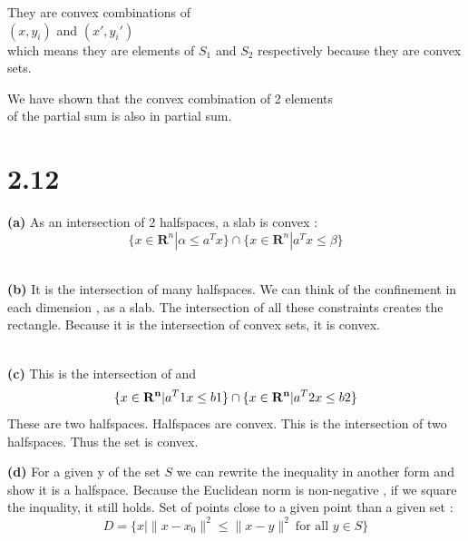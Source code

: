\documentclass{article}
\begin{document}
They are convex combinations of \\
$(x, y_i)$ and $(x', y_i')$ \\
which means they are elements of $S_1$ and $S_2$ respectively because they are convex sets.

We have shown that the convex combination of 2 elements \\
of the partial sum is also in partial sum.


























\newpage
\section*{2.12}
\textbf{(a)} As an intersection of  2 halfspaces, a slab is convex : \[ \{ x\in \mathbf{R}^n | \alpha \leq a^Tx \}\cap   \{ x\in \mathbf{R}^n |  a^Tx \leq  \beta\} \]


\\
\textbf{(b)} It is the intersection of many halfspaces. We can think of the confinement in each dimension , as a slab. The intersection of all these constraints creates the rectangle. Because it is the intersection of convex sets, it is convex. 

\\

\textbf{(c)} This is the intersection of and \[\{x \in \mathbf{R^n} | a^T
1x \leq b1 \} \\ \cap \\  \{x \in \mathbf{R^n} | a^T
2x \leq b2\} \]
These are two halfspaces. Halfspaces are convex. This is the intersection of two halfspaces. Thus the set is convex.

\textbf{(d)} For a given y of the set $S$ we can rewrite the inequality in another form and show it is a halfspace. 
Because the Euclidean norm is non-negative , if we square the inquality, it still holds.
Set of points close to a given point than a given set :
\[
D = \{ x \mid \|x - x_0\|^2 \le \|x - y\|^2 \ \text{for all } y \in S \}
\]
\end{document}
